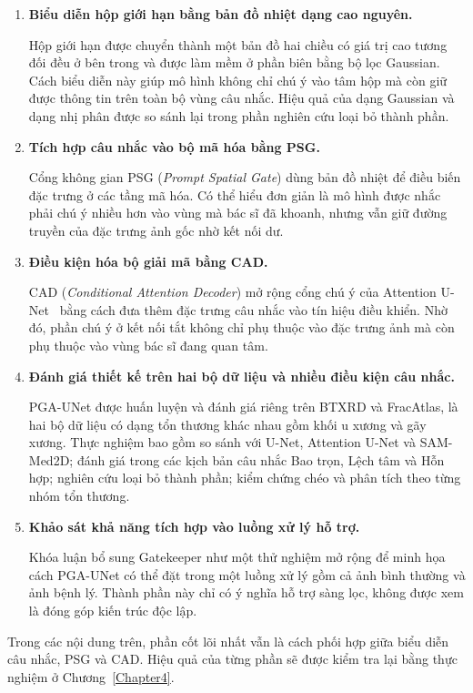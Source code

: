 \begin{enumerate}
    \item \textbf{Biểu diễn hộp giới hạn bằng bản đồ nhiệt dạng cao nguyên.}

    Hộp giới hạn được chuyển thành một bản đồ hai chiều có giá trị cao tương đối đều ở bên trong và được làm mềm ở phần biên bằng bộ lọc Gaussian. Cách biểu diễn này giúp mô hình không chỉ chú ý vào tâm hộp mà còn giữ được thông tin trên toàn bộ vùng câu nhắc. Hiệu quả của dạng Gaussian và dạng nhị phân được so sánh lại trong phần nghiên cứu loại bỏ thành phần.
    \item \textbf{Tích hợp câu nhắc vào bộ mã hóa bằng PSG.}

    Cổng không gian PSG (\textit{Prompt Spatial Gate}) dùng bản đồ nhiệt để điều biến đặc trưng ở các tầng mã hóa. Có thể hiểu đơn giản là mô hình được nhắc phải chú ý nhiều hơn vào vùng mà bác sĩ đã khoanh, nhưng vẫn giữ đường truyền của đặc trưng ảnh gốc nhờ kết nối dư.

    \item \textbf{Điều kiện hóa bộ giải mã bằng CAD.}

    CAD (\textit{Conditional Attention Decoder}) mở rộng cổng chú ý của Attention U-Net~\cite{oktay2018attentionunet} bằng cách đưa thêm đặc trưng câu nhắc vào tín hiệu điều khiển. Nhờ đó, phần chú ý ở kết nối tắt không chỉ phụ thuộc vào đặc trưng ảnh mà còn phụ thuộc vào vùng bác sĩ đang quan tâm.

    \item \textbf{Đánh giá thiết kế trên hai bộ dữ liệu và nhiều điều kiện câu nhắc.}

    PGA-UNet được huấn luyện và đánh giá riêng trên BTXRD và FracAtlas, là hai bộ dữ liệu có dạng tổn thương khác nhau gồm khối u xương và gãy xương. Thực nghiệm bao gồm so sánh với U-Net, Attention U-Net và SAM-Med2D; đánh giá trong các kịch bản câu nhắc Bao trọn, Lệch tâm và Hỗn hợp; nghiên cứu loại bỏ thành phần; kiểm chứng chéo và phân tích theo từng nhóm tổn thương.

    \item \textbf{Khảo sát khả năng tích hợp vào luồng xử lý hỗ trợ.}

    Khóa luận bổ sung Gatekeeper như một thử nghiệm mở rộng để minh họa cách PGA-UNet có thể đặt trong một luồng xử lý gồm cả ảnh bình thường và ảnh bệnh lý. Thành phần này chỉ có ý nghĩa hỗ trợ sàng lọc, không được xem là đóng góp kiến trúc độc lập.
\end{enumerate}

Trong các nội dung trên, phần cốt lõi nhất vẫn là cách phối hợp giữa biểu diễn câu nhắc, PSG và CAD. Hiệu quả của từng phần sẽ được kiểm tra lại bằng thực nghiệm ở Chương~\ref{Chapter4}.
